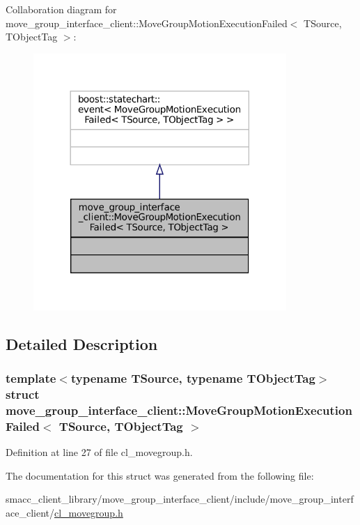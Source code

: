 Collaboration diagram for move\+\_\+group\+\_\+interface\+\_\+client\+:\+:Move\+Group\+Motion\+Execution\+Failed$<$ T\+Source, T\+Object\+Tag $>$\+:
\nopagebreak
\begin{figure}[H]
\begin{center}
\leavevmode
\includegraphics[width=272pt]{structmove__group__interface__client_1_1MoveGroupMotionExecutionFailed__coll__graph}
\end{center}
\end{figure}


\subsection{Detailed Description}
\subsubsection*{template$<$typename T\+Source, typename T\+Object\+Tag$>$\newline
struct move\+\_\+group\+\_\+interface\+\_\+client\+::\+Move\+Group\+Motion\+Execution\+Failed$<$ T\+Source, T\+Object\+Tag $>$}



Definition at line 27 of file cl\+\_\+movegroup.\+h.



The documentation for this struct was generated from the following file\+:\begin{DoxyCompactItemize}
\item 
smacc\+\_\+client\+\_\+library/move\+\_\+group\+\_\+interface\+\_\+client/include/move\+\_\+group\+\_\+interface\+\_\+client/\hyperlink{cl__movegroup_8h}{cl\+\_\+movegroup.\+h}\end{DoxyCompactItemize}
